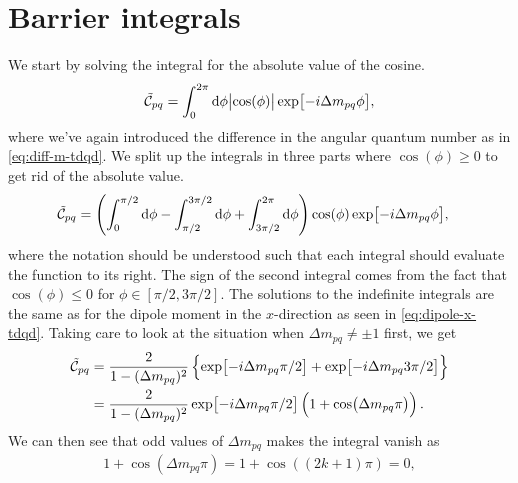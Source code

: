     \section{Barrier integrals}
        \label{app:barrier-integrals}
        We start by solving the integral for the absolute value of the cosine.
        \begin{align}
            \tilde{\mathcal{C}}_{pq}
            =
            \int_{0}^{2\pi} \dd \phi
            \abs{\cos(\phi)}
            \exp[-i\Delta m_{pq} \phi],
        \end{align}
        where we've again introduced the difference in the angular quantum
        number as in \autoref{eq:diff-m-tdqd}.
        We split up the integrals in three parts where $\cos(\phi) \geq 0$ to
        get rid of the absolute value.
        \begin{align}
            \tilde{\mathcal{C}}_{pq}
            &=
            \left( 
                \int_{0}^{\pi/2}
                \dd \phi
                -
                \int_{\pi/2}^{3\pi/2}
                \dd \phi
                +
                \int_{3\pi/2}^{2\pi}
                \dd \phi
             \right)
            \cos(\phi)
            \exp[-i\Delta m_{pq}\phi],
        \end{align}
        where the notation should be understood such that each integral should
        evaluate the function to its right.
        The sign of the second integral comes from the fact that $\cos(\phi)
        \leq 0$ for $\phi \in [\pi/2, 3\pi/2]$.
        The solutions to the indefinite integrals are the same as for the dipole
        moment in the $x$-direction as seen in \autoref{eq:dipole-x-tdqd}.
        Taking care to look at the situation when $\Delta m_{pq} \neq \pm 1$
        first, we get
        \begin{align}
            \tilde{\mathcal{C}}_{pq}
            &=
            \frac{2}{1 - (\Delta m_{pq})^2}\left\{ 
                \exp[-i\Delta m_{pq} \pi / 2]
                + \exp[-i \Delta m_{pq} 3\pi / 2]
             \right\}
            \\
            &= \frac{2}{1 - (\Delta m_{pq})^2}
            \exp[-i\Delta m_{pq} \pi / 2]
            \left( 
                1 + \cos(\Delta m_{pq} \pi)
             \right).
        \end{align}
        We can then see that odd values of $\Delta m_{pq}$ makes the integral
        vanish as
        \begin{align}
            1 + \cos(\Delta m_{pq} \pi)
            = 1 + \cos((2k + 1) \pi) = 0,
        \end{align}
